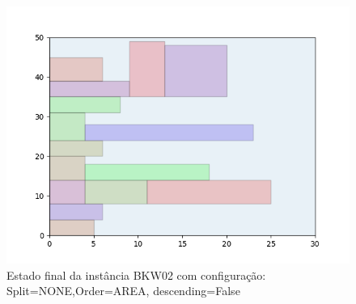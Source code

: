 \begin{figure}[H]
    \centering
    \caption[]{Estado final da instância BKW02 com configuração: Split=NONE,Order=AREA, descending=False}
    \label{fig:bkw02-none-area-false}
    \includegraphics[scale=0.5]{output/figures/bkw/bkw02/none/area/false/00}
\end{figure}
